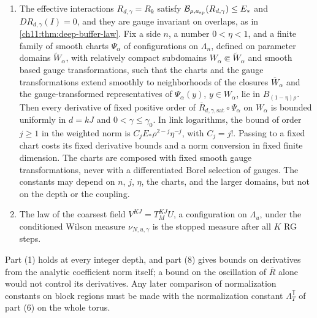 \begin{theorem}
\begin{enumerate}
\item The effective interactions $R_{d,\gamma}=R_k$ satisfy $\mathcal B_{\rho,a_{\mathrm{sp}}}(R_{d,\gamma})\le E_*$ and $DR_{d,\gamma}(I)=0$, and they are gauge invariant on overlaps, as in \cref{ch11:thm:deep-buffer-law}. Fix a side $n$, a number $0<\eta<1$, and a finite family of smooth charts $\Psi_\alpha$ of configurations on $\Lambda_n$, defined on parameter domains $\widetilde W_\alpha$, with relatively compact subdomains $W_\alpha\Subset\widetilde W_\alpha$ and smooth based gauge transformations, such that the charts and the gauge transformations extend smoothly to neighborhoods of the closures $\overline W_\alpha$ and the gauge-transformed representatives of $\Psi_\alpha(y)$, $y\in W_\alpha$, lie in $B_{(1-\eta)\rho}$. Then every derivative of fixed positive order of $\overline R_{d,\gamma,\mathrm{sat}}\circ\Psi_\alpha$ on $W_\alpha$ is bounded uniformly in $d=kJ$ and $0<\gamma\le\gamma_0$. In link logarithms, the bound of order $j\ge1$ in the weighted norm is $C_jE_*\rho^{2-j}\eta^{-j}$, with $C_j=j!$. Passing to a fixed chart costs its fixed derivative bounds and a norm conversion in fixed finite dimension. The charts are composed with fixed smooth gauge transformations, never with a differentiated Borel selection of gauges. The constants may depend on $n$, $j$, $\eta$, the charts, and the larger domains, but not on the depth or the coupling.
\item The law of the coarsest field $V^{KJ}=T_M^{KJ}U$, a configuration on $\Lambda_u$, under the conditioned Wilson measure $\nu_{N,u,\gamma}$ is the stopped measure after all $K$ RG steps.
\end{enumerate}
\end{theorem}

Part (1) holds at every integer depth, and part (8) gives bounds on derivatives from the analytic coefficient norm itself; a bound on the oscillation of $\overline R$ alone would not control its derivatives. Any later comparison of normalization constants on block regions must be made with the normalization constant $\Lambda_T^{\mathbb T}$ of part (6) on the whole torus.

